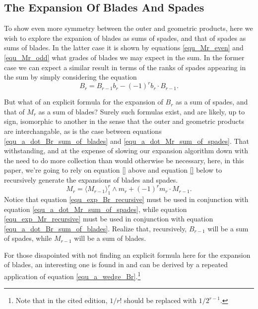 \documentclass{birkjour}
\theoremstyle{definition}
\theoremstyle{remark}
\numberwithin{equation}{section}
\begin{document}
\subsection{The Expansion Of Blades And Spades}

To show even more symmetry between the outer and geometric products, here we wish to explore the expanion of
blades as sums of spades, and that of spades as sums of blades.
In the latter case it is shown by equations \eqref{equ_Mr_even} and \eqref{equ_Mr_odd} what grades of blades we may expect in the sum.
In the former case we can expect a similar result in terms of the ranks of spades appearing in the sum by simply
considering the equation
\begin{equation}\label{equ_exp_Br_recursive}
B_r = B_{r-1}b_r - (-1)^rb_r\cdot B_{r-1}.
\end{equation}

But what of an explicit formula for the expansion of $B_r$ as a sum of spades, and that of $M_r$ as a sum of blades?
Surely such formulas exist, and are likely, up to sign, isomorphic to another in the sense that the outer and geometric products
are interchangable, as is the case between equations \eqref{equ_a_dot_Br_sum_of_blades} and \eqref{equ_a_dot_Mr_sum_of_spades}.
That withstanding, and at the expense of slowing our expansion
algorithm down with the need to do more collection than would otherwise be necessary, here, in this paper, we're going to rely on equation \eqref{} above and
equation \eqref{} below to recursively generate the expansions of blades and spades.
\begin{equation}\label{equ_exp_Mr_recursive}
M_r = \langle M_{r-1}\rangle_1^r\wedge m_r + (-1)^rm_r \cdot M_{r-1}.
\end{equation}
Notice that equation \eqref{equ_exp_Br_recursive} must be used in conjunction with equation \eqref{equ_a_dot_Mr_sum_of_spades}, while
equation \eqref{equ_exp_Mr_recursive} must be used in conjunction with equation \eqref{equ_a_dot_Br_sum_of_blades}.  Realize that, recursively,
$B_{r-1}$ will be a sum of spades, while $M_{r-1}$ will be a sum of blades.

For those disapointed with not finding an explicit formula here for the expansion of blades,
an interesting one is found in \cite[p.~86]{DoranLasenby03} and can be derived by a
repeated application of equation \eqref{equ_a_wedge_Br}.\footnote{Note that in the cited edition, $1/r!$ should be replaced with $1/2^{r-1}$.}

\end{document}

